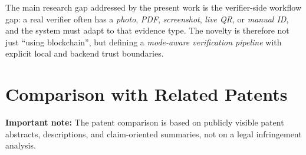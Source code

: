 \documentclass[12pt,a4paper]{article}
\begin{document}
The main research gap addressed by the present work is the verifier-side workflow gap: a real verifier often has a \emph{photo}, \emph{PDF}, \emph{screenshot}, \emph{live QR}, or \emph{manual ID}, and the system must adapt to that evidence type. The novelty is therefore not just ``using blockchain'', but defining a \emph{mode-aware verification pipeline} with explicit local and backend trust boundaries.

\section{Comparison with Related Patents}
\textbf{Important note:} The patent comparison is based on publicly visible patent abstracts, descriptions, and claim-oriented summaries, not on a legal infringement analysis.
\end{document}
